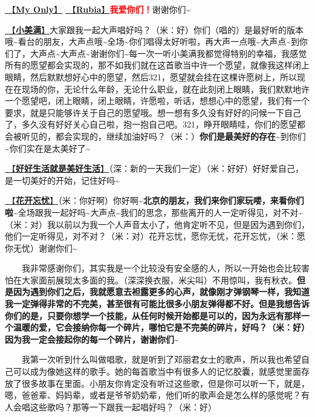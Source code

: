 \documentclass[]{ctexbook}
\begin{document}
\hyperref[my-only]{🎵【\textbf{My Only}】} \hyperref[rubia]{🎵【\textbf{Rubia}】}\textbf{\textcolor{red}{我爱你们！}}谢谢你们\textasciitilde{}

\hyperref[happy-ending]{🎵【\textbf{小美满}】}大家跟我一起大声唱好吗？（米：好）你们（唱的）是最好听的版本哦\textasciitilde 看台的朋友，大声点哦\textasciitilde 全场\textasciitilde 你们唱得太好听啦，再大声一点哦\textasciitilde 大声点\textasciitilde 到你们了，大声点\textasciitilde 大声点\textasciitilde 谢谢你们\textasciitilde 每一次一听小美满我都觉得特别的幸福，我感觉所有的愿望都会实现的，那不如我们就在这首歌当中许一个愿望，就像我这样闭上眼睛，然后默默想好心中的愿望，然后321，愿望就会挂在这棵许愿树上，所以现在在现场的你，无论什么年龄，无论什么职业，就在此刻闭上眼睛，我们默默地许一个愿望吧，闭上眼睛，闭上眼睛，许愿啦，听话，想想心中的愿望，我们有一个要求，就是只能够许关于自己的愿望哦。想一想有多久没有好好的问候一下自己了，多久没有好好关心自己啦，抱一抱自己吧。321，睁开眼睛哇，你们的愿望都会被听见的，都会实现的，继续加油好吗？（米：）\textbf{你们是最美好的存在\textasciitilde{}}到你们\textasciitilde 你们实在是太美好了\textasciitilde{}

\hyperref[live-happy-life-happy]{🎵【\textbf{好好生活就是美好生活}】}（深：新的一天我们一定）（米：好好）好好爱自己，是一切美好的开始，记住好吗\textasciitilde{}

\hyperref[no-worries]{🎵【\textbf{花开忘忧}】}（米：你好啊）你好啊\textasciitilde{}\textbf{北京的朋友，我们来你们家玩喽，来看你们啦\textasciitilde{}}全场跟我一起好吗\textasciitilde 大声点\textasciitilde 我们的思念，那些离开的人一定听得见，对不对\textasciitilde（米：对）我以前以为我一个人声音太小了，他肯定听不见，但是因为遇到你们，他们一定听得见，对不对？（米：对）花开忘忧，愿你无忧，花开忘忧，（米：愿你无忧）谢谢你们\textasciitilde{}

  我非常感谢你们，其实我是一个比较没有安全感的人，所以一开始也会比较害怕在大家面前展现太多面的我。（深深换衣服，米尖叫）不用惊叫，我有秋衣。\textbf{但是因为遇到你们之后，我就愿意去袒露更多的心声，就像刚才弹钢琴一样，我知道我一定弹得非常的不完美，甚至很有可能比很多小朋友弹得都不好。但是我想告诉你们的是，只要你想学一个技能，从任何时候开始都是可以的，因为永远有那样一个温暖的爱，它会接纳你每一个碎片，哪怕它是不完美的碎片，好吗？（米：好）因为我一定会接起你的每一个碎片，谢谢你们\textasciitilde{}}

  我第一次听到什么叫做唱歌，就是听到了邓丽君女士的歌声，所以我也希望自己可以成为像她这样的歌手。她的每首歌当中有很多人的记忆胶囊，就感觉里面存放了很多故事在里面。小朋友你肯定没有听过这些歌，但是你可以听一下，就是，嗯，爸爸辈、妈妈辈，或者是爷爷奶奶辈，他们听的歌声会是怎么样的感觉呢？有人会唱这些歌吗？那等一下跟我一起唱好吗？（米：好）
\end{document}
